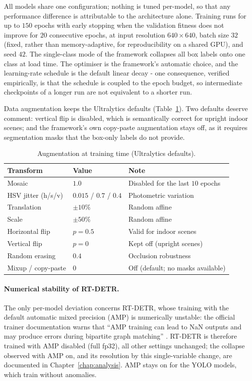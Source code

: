 All models share one configuration; nothing is tuned per-model, so that any
performance difference is attributable to the architecture alone. Training runs
for up to $150$ epochs with early stopping when the validation fitness does not
improve for $20$ consecutive epochs, at input resolution $640 \times 640$,
batch size $32$ (fixed, rather than memory-adaptive, for reproducibility on a
shared GPU), and seed $42$. The single-class mode of the framework collapses
all box labels onto one class at load time. The optimiser is the framework's
automatic choice, and the learning-rate schedule is the default linear decay -
one consequence, verified empirically, is that the schedule is coupled to the
epoch budget, so intermediate checkpoints of a longer run are not equivalent to
a shorter run.

Data augmentation keeps the Ultralytics defaults (Table~\ref{tab:p1-aug}).
Two defaults deserve comment: vertical flip is disabled, which is semantically
correct for upright indoor scenes; and the framework's own copy-paste
augmentation stays off, as it requires segmentation masks that the box-only
labels do not provide.

\begin{table}[h]
  \centering
  \begin{tabular}{lll}
    \hline
    Transform & Value & Note \\
    \hline
    Mosaic & $1.0$ & Disabled for the last $10$ epochs \\
    HSV jitter (h/s/v) & $0.015$ / $0.7$ / $0.4$ & Photometric variation \\
    Translation & $\pm 10\%$ & Random affine \\
    Scale & $\pm 50\%$ & Random affine \\
    Horizontal flip & $p = 0.5$ & Valid for indoor scenes \\
    Vertical flip & $p = 0$ & Kept off (upright scenes) \\
    Random erasing & $0.4$ & Occlusion robustness \\
    Mixup / copy-paste & $0$ & Off (default; no masks available) \\
    \hline
  \end{tabular}
  \caption{Augmentation at training time (Ultralytics defaults).}
  \label{tab:p1-aug}
\end{table}

\paragraph{Numerical stability of RT-DETR.} The only per-model deviation
concerns RT-DETR, whose training with the default automatic mixed precision
(AMP) is numerically unstable: the official trainer documentation warns that
``AMP training can lead to NaN outputs and may produce errors during bipartite
graph matching'' \cite{UltralyticsRTDETRTrainer}. RT-DETR is therefore trained
with AMP disabled (full fp32), all other settings unchanged; the collapse
observed with AMP on, and its resolution by this single-variable change, are
documented in Chapter~\ref{chap:analysis}. AMP stays on for the YOLO models,
which train without anomalies.

